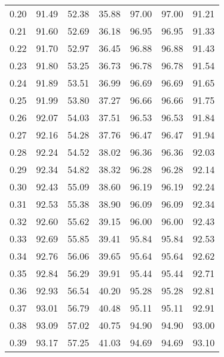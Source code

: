 \begin{tabular}{|c|c|c|c|c|c|c|}
      0.20 &     91.49 &     52.38 &      35.88 &   97.00 &      97.00 &         91.21 \\
      0.21 &     91.60 &     52.69 &      36.18 &   96.95 &      96.95 &         91.33 \\
      0.22 &     91.70 &     52.97 &      36.45 &   96.88 &      96.88 &         91.43 \\
      0.23 &     91.80 &     53.25 &      36.73 &   96.78 &      96.78 &         91.54 \\
      0.24 &     91.89 &     53.51 &      36.99 &   96.69 &      96.69 &         91.65 \\
      0.25 &     91.99 &     53.80 &      37.27 &   96.66 &      96.66 &         91.75 \\
      0.26 &     92.07 &     54.03 &      37.51 &   96.53 &      96.53 &         91.84 \\
      0.27 &     92.16 &     54.28 &      37.76 &   96.47 &      96.47 &         91.94 \\
      0.28 &     92.24 &     54.52 &      38.02 &   96.36 &      96.36 &         92.03 \\
      0.29 &     92.34 &     54.82 &      38.32 &   96.28 &      96.28 &         92.14 \\
      0.30 &     92.43 &     55.09 &      38.60 &   96.19 &      96.19 &         92.24 \\
      0.31 &     92.53 &     55.38 &      38.90 &   96.09 &      96.09 &         92.34 \\
      0.32 &     92.60 &     55.62 &      39.15 &   96.00 &      96.00 &         92.43 \\
      0.33 &     92.69 &     55.85 &      39.41 &   95.84 &      95.84 &         92.53 \\
      0.34 &     92.76 &     56.06 &      39.65 &   95.64 &      95.64 &         92.62 \\
      0.35 &     92.84 &     56.29 &      39.91 &   95.44 &      95.44 &         92.71 \\
      0.36 &     92.93 &     56.54 &      40.20 &   95.28 &      95.28 &         92.81 \\
      0.37 &     93.01 &     56.79 &      40.48 &   95.11 &      95.11 &         92.91 \\
      0.38 &     93.09 &     57.02 &      40.75 &   94.90 &      94.90 &         93.00 \\
      0.39 &     93.17 &     57.25 &      41.03 &   94.69 &      94.69 &         93.10 \\

\end{tabular}
